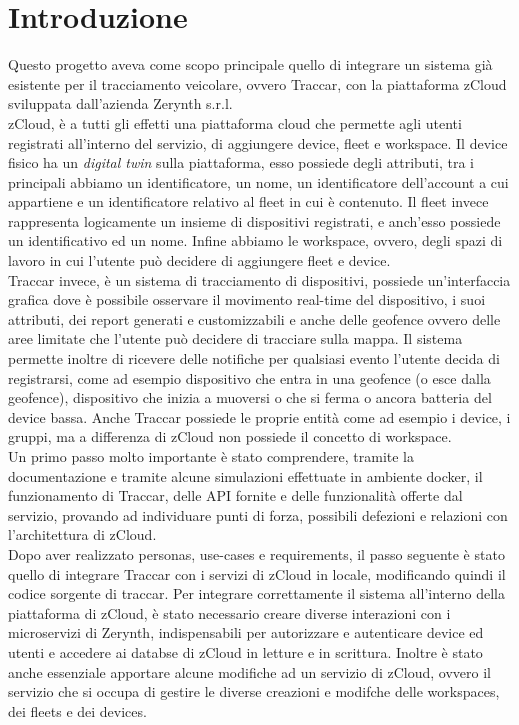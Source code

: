 \documentclass[a4paper,titlepage,12pt]{book}
\begin{document}
\chapter{
\sffamily
Introduzione}
Questo progetto aveva come scopo principale quello di integrare un sistema già esistente per il tracciamento veicolare, ovvero Traccar, con la piattaforma zCloud sviluppata dall'azienda Zerynth s.r.l.\\
zCloud, è a tutti gli effetti una piattaforma cloud che permette agli utenti registrati all'interno del servizio, di aggiungere device, fleet e workspace. Il device fisico ha un \textit{digital twin} sulla piattaforma, esso possiede degli attributi, tra i principali abbiamo un identificatore, un nome, un identificatore dell'account a cui appartiene e un identificatore relativo al fleet in cui è contenuto. Il fleet invece rappresenta logicamente un insieme di dispositivi registrati, e anch'esso possiede un identificativo ed un nome. Infine abbiamo le workspace, ovvero, degli spazi di lavoro in cui l'utente può decidere di aggiungere fleet e device.\\
Traccar invece, è un sistema di tracciamento di dispositivi, possiede un'interfaccia grafica dove è possibile osservare il movimento real-time del dispositivo, i suoi attributi, dei report generati e customizzabili e anche delle geofence ovvero delle aree limitate che l'utente può decidere di tracciare sulla mappa. Il sistema permette inoltre di ricevere delle notifiche per qualsiasi evento l'utente decida di registrarsi, come ad esempio dispositivo che entra in una geofence (o esce dalla geofence), dispositivo che inizia a muoversi o che si ferma o ancora batteria del device bassa. Anche Traccar possiede le proprie entità come ad esempio i device, i gruppi, ma a differenza di zCloud non possiede il concetto di workspace.\\
Un primo passo molto importante è stato comprendere, tramite la documentazione e tramite alcune simulazioni effettuate in ambiente docker, il funzionamento di Traccar, delle API fornite e delle funzionalità offerte dal servizio, provando ad individuare punti di forza, possibili defezioni e relazioni con l'architettura di zCloud.  \\
Dopo aver realizzato personas, use-cases e requirements, il passo seguente è stato quello di integrare Traccar con i servizi di zCloud in locale, modificando quindi il codice sorgente di traccar. Per integrare correttamente il sistema all'interno della piattaforma di zCloud, è stato necessario creare diverse interazioni con i microservizi di Zerynth, indispensabili per autorizzare e autenticare device ed utenti e accedere ai databse di zCloud in letture e in scrittura. Inoltre è stato anche essenziale apportare alcune modifiche ad un servizio di zCloud, ovvero il servizio che si occupa di gestire le diverse creazioni e modifche delle workspaces, dei fleets e dei devices.
\sffamily
\end{document}
